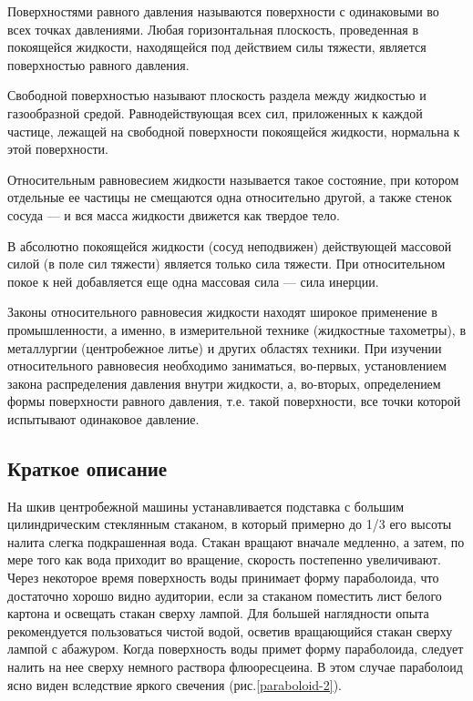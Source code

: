 \documentclass[All.tex]{subfiles}
\begin{document}
Поверхностями равного давления называются поверхности с одинаковыми во всех точках давлениями.
Любая горизонтальная плоскость, проведенная в покоящейся жидкости, находящейся под действием силы тяжести, является поверхностью равного давления.

Свободной поверхностью называют плоскость раздела между жидкостью и газообразной средой.
Равнодействующая всех сил, приложенных к каждой частице, лежащей на свободной поверхности покоящейся жидкости, нормальна к этой поверхности.

Относительным равновесием жидкости называется такое состояние, при котором отдельные ее частицы не смещаются одна относительно другой, 
а также стенок сосуда — и вся масса жидкости движется как твердое тело.

В абсолютно покоящейся жидкости (сосуд неподвижен) действующей массовой силой (в поле сил тяжести) является только сила тяжести.
При относительном покое к ней добавляется еще одна массовая сила — сила инерции.

Законы относительного равновесия жидкости находят широкое применение в промышленности, а именно, в измерительной технике (жидкостные тахометры), в металлургии (центробежное литье) и других областях техники.
При изучении относительного равновесия необходимо заниматься, во-первых, установлением закона распределения давления внутри жидкости, 
а, во-вторых, определением формы поверхности равного давления, т.е. такой поверхности, все точки которой испытывают одинаковое давление.

\subsection*{\textcolor{PineGreen}{Краткое описание}}

На шкив центробежной машины устанавливается подставка с большим цилиндрическим стеклянным стаканом, 
в который примерно до 1/3 его высоты налита слегка подкрашенная вода.
Стакан вращают вначале медленно, а затем, по мере того как вода приходит во вращение, скорость постепенно увеличивают. 
Через некоторое время поверхность воды принимает форму параболоида, что достаточно хорошо видно аудитории, если за стаканом поместить лист белого картона и освещать стакан сверху лампой. 
Для большей наглядности опыта рекомендуется пользоваться чистой водой, 
осветив вращающийся стакан сверху лампой с абажуром. 
Когда поверхность воды примет форму параболоида, следует налить на нее сверху немного раствора флюоресцеина. 
В этом случае параболоид ясно виден вследствие яркого свечения (рис.\ref{paraboloid-2}).
\end{document}
